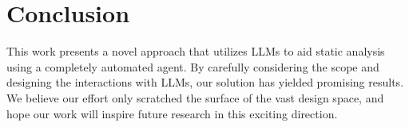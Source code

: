 

\section{Conclusion}






This work presents a novel approach that utilizes LLMs to aid static analysis using a completely automated agent.
By carefully considering the scope and designing the interactions with LLMs, our solution has yielded promising results.
We believe our effort only scratched the surface of the vast design space,
and hope our work will inspire future research in this exciting direction.

